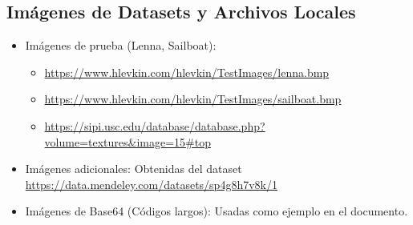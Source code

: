 \documentclass[a4paper, 12pt]{article}
\begin{document}
\subsection*{Imágenes de Datasets y Archivos Locales}
\begin{itemize}
    \item Imágenes de prueba (Lenna, Sailboat):
    \begin{itemize}
        \item \url{https://www.hlevkin.com/hlevkin/TestImages/lenna.bmp}
        \item \url{https://www.hlevkin.com/hlevkin/TestImages/sailboat.bmp}
        \item \url{https://sipi.usc.edu/database/database.php?volume=textures&image=15#top}
    \end{itemize}
    \item Imágenes adicionales: Obtenidas del dataset \url{https://data.mendeley.com/datasets/sp4g8h7v8k/1}
    \item Imágenes de Base64 (Códigos largos): Usadas como ejemplo en el documento.
\end{itemize}
\end{document}
